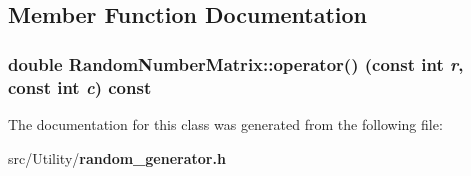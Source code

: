 \subsection{Member Function Documentation}
\subsubsection{\setlength{\rightskip}{0pt plus 5cm}double Random\-Number\-Matrix::operator() (const int {\em r}, const int {\em c}) const\hspace{0.3cm}{\tt  [inline]}}\label{classRandomNumberMatrix_206d5e7e6af04dcc4efec8c51234c261}




The documentation for this class was generated from the following file:\begin{CompactItemize}
\item 
src/Utility/\bf{random\_\-generator.h}\end{CompactItemize}
